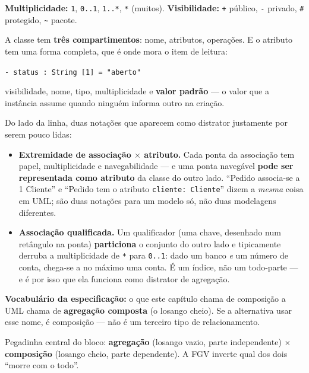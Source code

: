 \textbf{Multiplicidade:} \texttt{1}, \texttt{0..1}, \texttt{1..*}, \texttt{*}
(muitos). \textbf{Visibilidade:} \texttt{+} público, \texttt{-} privado,
\texttt{\#} protegido, \texttt{\~{}} pacote.

\begin{conceito}
A classe tem \textbf{três compartimentos}: nome, atributos, operações. E o
atributo tem uma forma completa, que é onde mora o item de leitura:

\begin{center}
\texttt{- status : String [1] = "aberto"}
\end{center}

\noindent visibilidade, nome, tipo, multiplicidade e \textbf{valor padrão} ---
o valor que a instância assume quando ninguém informa outro na criação.

Do lado da linha, duas notações que aparecem como distrator justamente por
serem pouco lidas:

\begin{itemize}
\item \textbf{Extremidade de associação $\times$ atributo.} Cada ponta da
associação tem papel, multiplicidade e navegabilidade --- e uma ponta navegável
\textbf{pode ser representada como atributo} da classe do outro lado. ``Pedido
associa-se a 1 Cliente'' e ``Pedido tem o atributo \texttt{cliente: Cliente}''
dizem a \emph{mesma} coisa em UML; são duas notações para um modelo só, não
duas modelagens diferentes.
\item \textbf{Associação qualificada.} Um qualificador (uma chave, desenhado
num retângulo na ponta) \textbf{particiona} o conjunto do outro lado e
tipicamente derruba a multiplicidade de \texttt{*} para \texttt{0..1}: dado um
banco \emph{e} um número de conta, chega-se a no máximo uma conta. É um
índice, não um todo-parte --- e é por isso que ela funciona como distrator de
agregação.
\end{itemize}

\textbf{Vocabulário da especificação:} o que este capítulo chama de composição
a UML chama de \textbf{agregação composta} (o losango cheio). Se a alternativa
usar esse nome, é composição --- não é um terceiro tipo de relacionamento.
\end{conceito}

\begin{pegadinha}
Pegadinha central do bloco: \textbf{agregação} (losango vazio, parte
independente) $\times$ \textbf{composição} (losango cheio, parte dependente).
A FGV inverte qual dos dois ``morre com o todo''.
\end{pegadinha}

